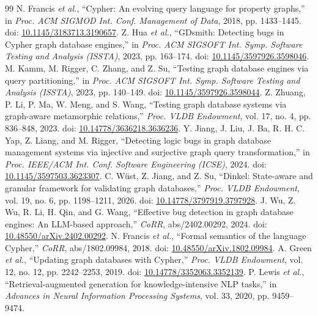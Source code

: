 \documentclass[acmsmall,screen,anonymous]{acmart}
\begin{document}
\clearpage
\begin{thebibliography}{99}
 N. Francis \emph{et al.}, ``Cypher: An evolving query language for property graphs,'' in \emph{Proc. ACM SIGMOD Int. Conf. Management of Data}, 2018, pp. 1433--1445. doi: \href{https://doi.org/10.1145/3183713.3190657}{10.1145/3183713.3190657}.
 Z. Hua \emph{et al.}, ``GDsmith: Detecting bugs in Cypher graph database engines,'' in \emph{Proc. ACM SIGSOFT Int. Symp. Software Testing and Analysis (ISSTA)}, 2023, pp. 163--174. doi: \href{https://doi.org/10.1145/3597926.3598046}{10.1145/3597926.3598046}.
 M. Kamm, M. Rigger, C. Zhang, and Z. Su, ``Testing graph database engines via query partitioning,'' in \emph{Proc. ACM SIGSOFT Int. Symp. Software Testing and Analysis (ISSTA)}, 2023, pp. 140--149. doi: \href{https://doi.org/10.1145/3597926.3598044}{10.1145/3597926.3598044}.
 Z. Zhuang, P. Li, P. Ma, W. Meng, and S. Wang, ``Testing graph database systems via graph-aware metamorphic relations,'' \emph{Proc. VLDB Endowment}, vol. 17, no. 4, pp. 836--848, 2023. doi: \href{https://doi.org/10.14778/3636218.3636236}{10.14778/3636218.3636236}.
 Y. Jiang, J. Liu, J. Ba, R. H. C. Yap, Z. Liang, and M. Rigger, ``Detecting logic bugs in graph database management systems via injective and surjective graph query transformation,'' in \emph{Proc. IEEE/ACM Int. Conf. Software Engineering (ICSE)}, 2024. doi: \href{https://doi.org/10.1145/3597503.3623307}{10.1145/3597503.3623307}.
 C. W\"ust, Z. Jiang, and Z. Su, ``Dinkel: State-aware and granular framework for validating graph databases,'' \emph{Proc. VLDB Endowment}, vol. 19, no. 6, pp. 1198--1211, 2026. doi: \href{https://doi.org/10.14778/3797919.3797928}{10.14778/3797919.3797928}.
 J. Wu, Z. Wu, R. Li, H. Qin, and G. Wang, ``Effective bug detection in graph database engines: An LLM-based approach,'' \emph{CoRR}, abs/2402.00292, 2024. doi: \href{https://doi.org/10.48550/arXiv.2402.00292}{10.48550/arXiv.2402.00292}.
 N. Francis \emph{et al.}, ``Formal semantics of the language Cypher,'' \emph{CoRR}, abs/1802.09984, 2018. doi: \href{https://doi.org/10.48550/arXiv.1802.09984}{10.48550/arXiv.1802.09984}.
 A. Green \emph{et al.}, ``Updating graph databases with Cypher,'' \emph{Proc. VLDB Endowment}, vol. 12, no. 12, pp. 2242--2253, 2019. doi: \href{https://doi.org/10.14778/3352063.3352139}{10.14778/3352063.3352139}.
 P. Lewis \emph{et al.}, ``Retrieval-augmented generation for knowledge-intensive NLP tasks,'' in \emph{Advances in Neural Information Processing Systems}, vol. 33, 2020, pp. 9459--9474.

\end{thebibliography}
\end{document}
